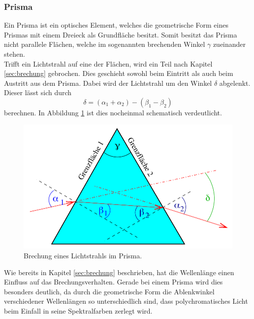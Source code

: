 \subsubsection*{Prisma}
\label{sec:prisma}
Ein Prisma ist ein optisches Element, welches die geometrische Form eines Prismas mit einem Dreieck als Grundfläche
besitzt. Somit besitzt das Prisma nicht parallele Flächen, welche im sogenannten
brechenden Winkel $\gamma$ zueinander stehen.
\\\noindent
Trifft ein Lichtstrahl auf eine der Flächen, wird ein Teil nach Kapitel
\ref{sec:brechung} gebrochen. Dies geschieht sowohl beim Eintritt als auch beim Austritt aus dem Prisma. Dabei wird
der Lichtstrahl um den Winkel $\delta$ abgelenkt. Dieser lässt sich durch
\begin{equation}
    \delta=(\alpha_1+\alpha_2)-(\beta_1-\beta_2)
    \label{eqn:ablenkwinkel}
\end{equation}
berechnen. In Abbildung \ref{fig:prisma2} ist dies nocheinmal schematisch verdeutlicht.
\begin{figure}[H]
    \centering
    \includegraphics[scale = 0.4]{pictures/Prisma.png}
    \caption{Brechung eines Lichtstrahls im Prisma. \cite{AP01}}
    \label{fig:prisma2}
\end{figure}
\noindent
Wie bereits in Kapitel \ref{sec:brechung} beschrieben, hat die Wellenlänge einen Einfluss auf das Brechungsverhalten.
Gerade bei einem Prisma wird dies besonders deutlich, da durch die geometrische Form die Ablenkwinkel verschiedener
Wellenlängen so unterschiedlich sind, dass polychromatisches Licht beim Einfall in seine Spektralfarben zerlegt wird.
